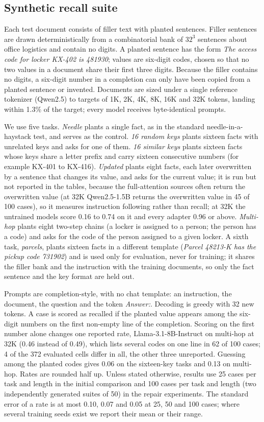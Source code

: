 \documentclass[11pt]{article}
\begin{document}
\subsection{Synthetic recall suite}
\label{sec:suite}
Each test document consists of filler text with planted sentences. Filler sentences are drawn deterministically from a combinatorial bank of $32^3$ sentences about office logistics and contain no digits. A planted sentence has the form \emph{The access code for locker KX-402 is 481930}; values are six-digit codes, chosen so that no two values in a document share their first three digits. Because the filler contains no digits, a six-digit number in a completion can only have been copied from a planted sentence or invented. Documents are sized under a single reference tokenizer (Qwen2.5) to targets of 1K, 2K, 4K, 8K, 16K and 32K tokens, landing within 1.3\% of the target; every model receives byte-identical prompts.

We use five tasks. \emph{Needle} plants a single fact, as in the standard needle-in-a-haystack test, and serves as the control. \emph{16 random keys} plants sixteen facts with unrelated keys and asks for one of them. \emph{16 similar keys} plants sixteen facts whose keys share a letter prefix and carry sixteen consecutive numbers (for example KX-401 to KX-416). \emph{Updated} plants eight facts, each later overwritten by a sentence that changes its value, and asks for the current value; it is run but not reported in the tables, because the full-attention sources often return the overwritten value (at 32K Qwen2.5-1.5B returns the overwritten value in 45 of 100 cases), so it measures instruction following rather than recall; at 32K the untrained models score 0.16 to 0.74 on it and every adapter 0.96 or above. \emph{Multi-hop} plants eight two-step chains (a locker is assigned to a person; the person has a code) and asks for the code of the person assigned to a given locker. A sixth task, \emph{parcels}, plants sixteen facts in a different template (\emph{Parcel 48213-K has the pickup code 731902}) and is used only for evaluation, never for training; it shares the filler bank and the instruction with the training documents, so only the fact sentence and the key format are held out.

Prompts are completion-style, with no chat template: an instruction, the document, the question and the token \emph{Answer:}. Decoding is greedy with 32 new tokens. A case is scored as recalled if the planted value appears among the six-digit numbers on the first non-empty line of the completion. Scoring on the first number alone changes one reported rate, Llama-3.1-8B-Instruct on multi-hop at 32K (0.46 instead of 0.49), which lists several codes on one line in 62 of 100 cases; 4 of the 372 evaluated cells differ in all, the other three unreported. Guessing among the planted codes gives 0.06 on the sixteen-key tasks and 0.13 on multi-hop. Rates are rounded half up. Unless stated otherwise, results use 25 cases per task and length in the initial comparison and 100 cases per task and length (two independently generated suites of 50) in the repair experiments. The standard error of a rate is at most 0.10, 0.07 and 0.05 at 25, 50 and 100 cases; where several training seeds exist we report their mean or their range.
\end{document}
